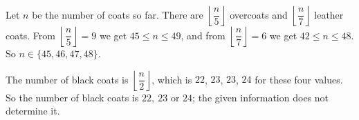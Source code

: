 Let $n$ be the number of coats so far. There are $\left\lfloor\dfrac {n}{5}\right\rfloor$ overcoats and $\left\lfloor\dfrac {n}{7}\right\rfloor$ leather coats. From $\left\lfloor\dfrac {n}{5}\right\rfloor=9$ we get $45\le n\le49$, and from $\left\lfloor\dfrac {n}{7}\right\rfloor=6$ we get $42\le n\le48$. So $n\in\{45,46,47,48\}$.

The number of black coats is $\left\lfloor\dfrac {n}{2}\right\rfloor$, which is $22$, $23$, $23$, $24$ for these four values. So the number of black coats is $\boxed{22,\ 23\text{ or }24}$; the given information does not determine it.
